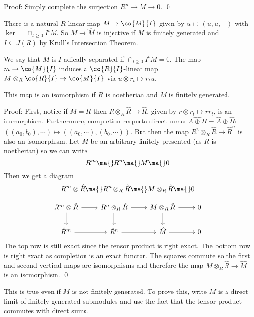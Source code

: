 \noindent Proof: Simply complete the surjection $R^n \to M \to 0$. \qed \\

\begin{rem}
There is a natural $R$-linear map $M \to \co{M}{I}$ given by $u \mapsto (u,u,\cdots)$ with $\ker= \cap_{t \geq 0} I^tM$. So $M \to \hat{M}$ is injective if $M$ is finitely generated and $I \subseteq J(R)$ by Krull's Intersection Theorem. 
\end{rem}

We say that $M$ is $I$-adically separated if $\cap_{t \geq 0} I^tM=0$. The map $m \to \co{M}{I}$ induces a $\co{R}{I}$-linear map $M \otimes_R \co{R}{I} \to \co{M}{I}$ via $u \otimes r_t \mapsto r_tu$.

\begin{prop}
This map is an isomorphism if $R$ is noetherian and $M$ is finitely generated.
\end{prop}

\noindent Proof: First, notice if $M=R$ then $R \otimes_R \hat{R} \to \hat{R}$, given by $r \otimes r_t \mapsto rr_t$, is an isomorphism. Furthermore, completion respects direct sums: $\hat{A \oplus B}=\hat{A} \oplus \hat{B}$: $((a_0,b_0),\cdots) \mapsto ((a_0,\cdots),(b_0,\cdots))$. But then the map $R^n \otimes_R \hat{R} \to \hat{R}^n$ is also an isomorphism. Let $M$ be an arbitrary finitely presented (as $R$ is noetherian) so we can write 
\[
R^m \ma{} R^n \ma{} M \ma{} 0
\]
Then we get a diagram 
\[
R^m \otimes \hat{R} \ma{} R^n \otimes_R \hat{R} \ma{} M \otimes_R \hat{R} \ma{} 0
\]

\[
\begin{tikzcd}
R^m \otimes \hat{R} \arrow{d} \arrow{r} & R^n \otimes_R \hat{R} \arrow{r} \arrow{d} & M \otimes_R \hat{R} \arrow{r} \arrow{d} & 0 \\
\hat{R}^m \arrow{r} & \hat{R}^n \arrow{r} & \hat{M} \arrow{r} & 0
\end{tikzcd}
\]
The top row is still exact since the tensor product is right exact. The bottom row is right exact as completion is an exact functor. The squares commute so the first and second vertical maps are isomorphisms and therefore the map $M \otimes_R \hat{R} \to \hat{M}$ is an isomorphism. \qed \\

\begin{rem}
This is true even if $M$ is not finitely generated. To prove this, write $M$ is a direct limit of finitely generated submodules and use the fact that the tensor product commutes with direct sums. 
\end{rem}

